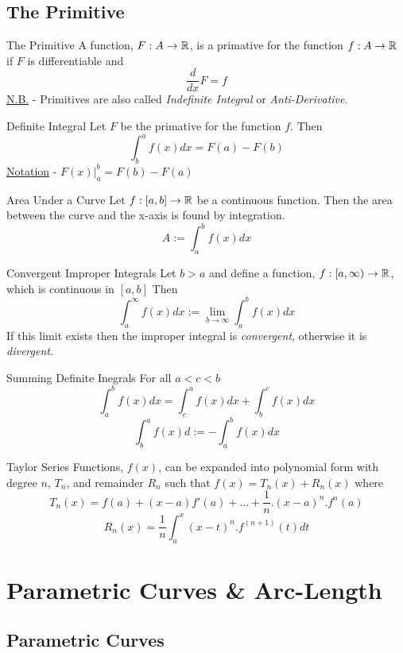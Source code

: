 \documentclass[11pt,a4paper]{article}
\begin{document}
\subsection{The Primitive}

\subtitle{Definition 4.01 - }{The Primitive}
A function, $F : A \to \mathbb{R}$, is a primative for the function $f : A \to \mathbb{R}$ if $F$ is differentiable and $$\displaystyle{\frac{d}{dx} F = f}$$
\underline{N.B.} - Primitives are also called \textit{Indefinite Integral} or \textit{Anti-Derivative}. \\

\subtitle{Definition 4.02 - }{Definite Integral}
Let $F$ be the primative for the function $f$. Then $$\int_{b}^{a} f(x) dx = F(a) - F(b)$$
\underline{Notation} - $F(x)\big|_{a}^{b} = F(b) - F(a)$\\

\subtitle{Remark 4.03 - }{Area Under a Curve}
Let $f : [a,b] \to \mathbb{R}$ be a continuous function. Then the area between the curve and the x-axis is found by integration. $$A := \int_{a}^{b} f(x) dx$$

\subtitle{Definition 4.04 - }{Convergent Improper Integrals}
Let $b > a$ and define a function, $f : \left[a, \infty\right) \to \mathbb{R}$, which is continuous in $[a, b]$ Then
$$\int_{a}^{\infty} f(x) dx := \lim_{b \to \infty} \int_{a}^{b} f(x) dx$$
If this limit exists then the improper integral is \textit{convergent}, otherwise it is \textit{divergent}. \\

\subtitle{Remark 4.05 - }{Summing Definite Inegrals}
For all $a < c < b$ $$\int_{a}^{b} f(x) dx = \int_{c}^{a} f(x) dx + \int_{b}^{c} f(x) dx$$ $$\displaystyle{\int_{b}^{a} f(x) d := -\int_{a}^{b} f(x) dx}$$

\subtitle{Theorem 4.06 - }{Taylor Series}
Functions, $f(x)$, can be expanded into polynomial form with degree $n$, $T_n$, and remainder $R_n$ such that $f(x) = T_n(x) + R_n(x)$ where
$$T_n(x) = f(a) + (x-a)f'(a) + ... + \frac{1}{n}.(x-a)^n.f^n(a)$$
$$R_n(x) = \frac{1}{n} \int_{a}^{x} (x-t)^n.f^{(n+1)}(t) dt$$

\section{Parametric Curves \& Arc-Length}

\subsection{Parametric Curves}
\end{document}
